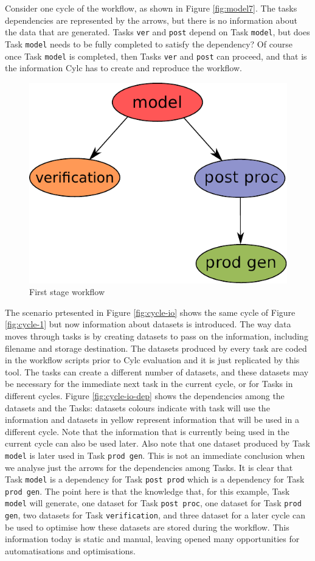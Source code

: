 \documentclass[a4paper]{article}
\begin{document}
Consider one cycle of the workflow, as shown in Figure \ref{fig:model7}. The tasks dependencies are represented by the arrows, but there is no information about the data that are generated. Tasks \texttt{ver} and \texttt{post} depend on Task \texttt{model}, but does Task \texttt{model} needs to be fully completed to satisfy the dependency? Of course once Task \texttt{model} is completed, then Tasks \texttt{ver} and \texttt{post} can proceed, and that is the information Cylc has to create and reproduce the workflow.

\begin{figure}[H]
  \centering
  \includegraphics[width=0.4\columnwidth]{cycle1}
  \caption{First stage workflow}
  \label{fig:cycle1}
\end{figure}

The scenario prtesented in Figure \ref{fig:cycle-io} shows the same cycle of Figure \ref{fig:cycle-1} but now information about datasets is introduced. The way data moves through tasks is by creating datasets to pass on the information, including filename and storage destination. The datasets produced by every task are coded in the workflow scripts prior to Cylc evaluation and it is just replicated by this tool. The tasks can create a different number of datasets, and these datasets may be necessary for the immediate next task in the current cycle, or for Tasks in different cycles. Figure \ref{fig:cycle-io-dep} shows the dependencies among the datasets and the Tasks: datasets colours indicate with task will use the information and datasets in yellow represent information that will be used in a different cycle. Note that the information that is currently being used in the current cycle can also be used later.
Also note that one dataset produced by Task \texttt{model} is later used in Task \texttt{prod gen}. This is not an immediate conclusion when we analyse just the arrows for the dependencies among Tasks. It is clear that Task \texttt{model} is a dependency for Task \texttt{post prod} which is a dependency for Task \texttt{prod gen}. The point here is that the knowledge that, for this example, Task \texttt{model} will generate, one dataset for Task \texttt{post proc}, one dataset for Task \texttt{prod gen}, two datasets for Task \texttt{verification}, and three dataset for a later cycle can be used to optimise how these datasets are stored during the workflow. This information today is static and manual, leaving opened many opportunities for automatisations and optimisations.
\end{document}
